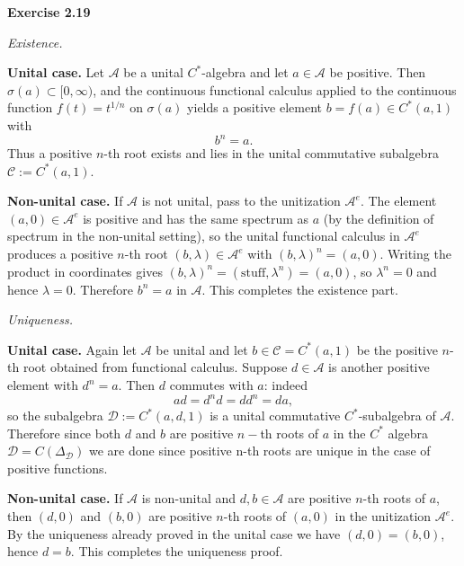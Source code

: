 \documentclass{article}
\begin{document}
\textbf{Exercise 2.19}

\medskip

\noindent\emph{Existence.} 

\smallskip

\noindent\textbf{Unital case.} Let \(\mathcal A\) be a unital \(C^*\)-algebra and let \(a\in\mathcal A\) be positive. Then \(\sigma(a)\subset[0,\infty)\), and the continuous functional calculus applied to the continuous function \(f(t)=t^{1/n}\) on \(\sigma(a)\) yields a positive element \(b=f(a)\in C^*(a,1)\) with
\[
b^n=a.
\]
Thus a positive \(n\)-th root exists and lies in the unital commutative subalgebra \(\mathcal C:=C^*(a,1)\).

\smallskip

\noindent\textbf{Non-unital case.} If \(\mathcal A\) is not unital, pass to the unitization \(\mathcal A^e\). The element \((a,0)\in\mathcal A^e\) is positive and has the same spectrum as \(a\) (by the definition of spectrum in the non-unital setting), so the unital functional calculus in \(\mathcal A^e\) produces a positive \(n\)-th root \((b,\lambda)\in\mathcal A^e\) with \((b,\lambda)^n=(a,0)\). Writing the product in coordinates gives \((b,\lambda)^n = (\text{stuff},\lambda^n)=(a,0)\), so \(\lambda^n=0\) and hence \(\lambda=0\). Therefore \(b^n=a\) in \(\mathcal A\). This completes the existence part.

\medskip

\noindent\emph{Uniqueness.}

\smallskip

\noindent\textbf{Unital case.} Again let $\mathcal A$ be unital and let \(b\in\mathcal C=C^*(a,1)\) be the positive \(n\)-th root obtained from functional calculus. Suppose \(d\in\mathcal A\) is another positive element with \(d^n=a\). Then \(d\) commutes with \(a\): indeed
\[
ad = d^n d = d d^n = da,
\]
so the subalgebra \(\mathcal D:=C^*(a,d,1)\) is a unital commutative \(C^*\)-subalgebra of \(\mathcal A\). Therefore since both $d$ and $b$ are positive $n-$th roots of $a$ in the $C^*$ algebra $\mathcal D = C(\Delta_\mathcal D)$ we are done since positive n-th roots are unique in the case of positive functions.

\smallskip

\noindent\textbf{Non-unital case.} If \(\mathcal A\) is non-unital and \(d,b\in\mathcal A\) are positive \(n\)-th roots of \(a\), then \((d,0)\) and \((b,0)\) are positive \(n\)-th roots of \((a,0)\) in the unitization \(\mathcal A^e\). By the uniqueness already proved in the unital case we have \((d,0)=(b,0)\), hence \(d=b\). This completes the uniqueness proof.
\end{document}
